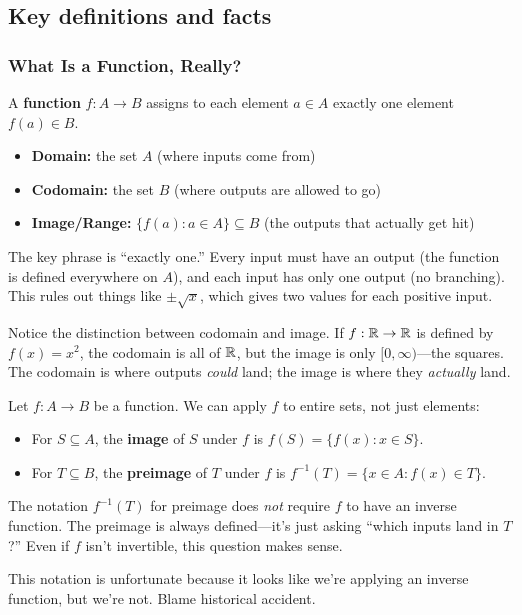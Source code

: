 \subsection*{Key definitions and facts}

\subsubsection*{What Is a Function, Really?}

\begin{definition}[Function]
A \textbf{function} $f: A \to B$ assigns to each element $a \in A$ exactly one element $f(a) \in B$.
\begin{itemize}
  \item \textbf{Domain:} the set $A$ (where inputs come from)
  \item \textbf{Codomain:} the set $B$ (where outputs are allowed to go)
  \item \textbf{Image/Range:} $\{f(a) : a \in A\} \subseteq B$ (the outputs that actually get hit)
\end{itemize}
\end{definition}

The key phrase is ``exactly one.'' Every input must have an output (the function is defined everywhere on $A$), and each input has only one output (no branching). This rules out things like $\pm\sqrt{x}$, which gives two values for each positive input.

Notice the distinction between codomain and image. If $f: \mathbb{R} \to \mathbb{R}$ is defined by $f(x) = x^2$, the codomain is all of $\mathbb{R}$, but the image is only $[0, \infty)$---the squares. The codomain is where outputs \emph{could} land; the image is where they \emph{actually} land.

\begin{definition}
Let $f: A \to B$ be a function. We can apply $f$ to entire sets, not just elements:
\begin{itemize}
  \item For $S \subseteq A$, the \textbf{image} of $S$ under $f$ is $f(S) = \{f(x) : x \in S\}$.
  \item For $T \subseteq B$, the \textbf{preimage} of $T$ under $f$ is $f^{-1}(T) = \{x \in A : f(x) \in T\}$.
\end{itemize}
\end{definition}

\begin{warning}
The notation $f^{-1}(T)$ for preimage does \emph{not} require $f$ to have an inverse function. The preimage is always defined---it's just asking ``which inputs land in $T$?'' Even if $f$ isn't invertible, this question makes sense.

This notation is unfortunate because it looks like we're applying an inverse function, but we're not. Blame historical accident.
\end{warning}


